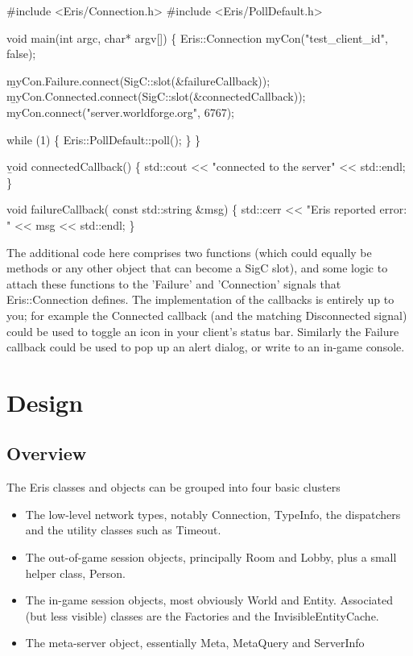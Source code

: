 \documentclass{article}
\begin{document}
{\tt

#include <Eris/Connection.h>
#include <Eris/PollDefault.h>

void main(int argc, char* argv[])
\{
    Eris::Connection myCon("test\_client\_id", false);
    
    {\b myCon.Failure.connect(SigC::slot(&failureCallback)); }
    {\b myCon.Connected.connect(SigC::slot(&connectedCallback)); }
    myCon.connect("server.worldforge.org", 6767);
    
    while (1) \{
	Eris::PollDefault::poll();
    \}
\}

{\b
void connectedCallback()
\{
    std::cout << "connected to the server" << std::endl;
\}

void failureCallback( const std::string &msg)
\{
    std::cerr << "Eris reported error: " << msg << std::endl;
\}
}

The additional code here comprises two functions (which could equally be methods
or any other object that can become a SigC slot), and some logic to attach these
functions to the 'Failure' and 'Connection' signals that Eris::Connection defines.
The implementation of the callbacks is entirely up to you; for example the
Connected callback (and the matching Disconnected signal) could be used to toggle
an icon in your client's status bar. Similarly the Failure callback could be used to
pop up an alert dialog, or write to an in-game console.

\section{Design}

\subsection{Overview}

The Eris classes and objects can be grouped into four basic clusters
\begin{itemize}
\item The low-level network types, notably Connection, TypeInfo, the
dispatchers and the utility classes such as Timeout.
\item The out-of-game session objects, principally Room and Lobby, plus
a small helper class, Person.
\item The in-game session objects, most obviously World and Entity. Associated
(but less visible) classes are the Factories and the InvisibleEntityCache.
\item The meta-server object, essentially Meta, MetaQuery and ServerInfo
\end{itemize}

}
\end{document}
